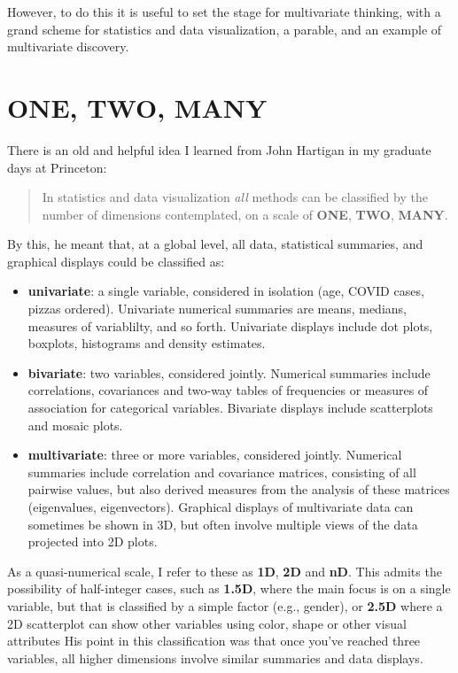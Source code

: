 \documentclass[
  letterpaper,
  10pt,
  krantz2]{krantz}
\providecommand{\tightlist}{%
  \setlength{\itemsep}{0pt}\setlength{\parskip}{0pt}}\usepackage{longtable,booktabs,array}
\begin{document}
However, to do this it is useful to set the stage for multivariate
thinking, with a grand scheme for statistics and data visualization, a
parable, and an example of multivariate discovery.

\hypertarget{one-two-many}{%
\section*{ONE, TWO, MANY}\label{one-two-many}}


There is an old and helpful idea I learned from John Hartigan in my
graduate days at Princeton:

\begin{quote}
In statistics and data visualization \emph{all} methods can be
classified by the number of dimensions contemplated, on a scale of
\textbf{ONE}, \textbf{TWO}, \textbf{MANY}.
\end{quote}

By this, he meant that, at a global level, all data, statistical
summaries, and graphical displays could be classified as:

\begin{itemize}
\tightlist
\item
  \textbf{univariate}: a single variable, considered in isolation (age,
  COVID cases, pizzas ordered). Univariate numerical summaries are
  means, medians, measures of variablilty, and so forth. Univariate
  displays include dot plots, boxplots, histograms and density
  estimates.
\item
  \textbf{bivariate}: two variables, considered jointly. Numerical
  summaries include correlations, covariances and two-way tables of
  frequencies or measures of association for categorical variables.
  Bivariate displays include scatterplots and mosaic plots.
\item
  \textbf{multivariate}: three or more variables, considered jointly.
  Numerical summaries include correlation and covariance matrices,
  consisting of all pairwise values, but also derived measures from the
  analysis of these matrices (eigenvalues, eigenvectors). Graphical
  displays of multivariate data can sometimes be shown in 3D, but often
  involve multiple views of the data projected into 2D plots.
\end{itemize}

As a quasi-numerical scale, I refer to these as \textbf{1D}, \textbf{2D}
and \textbf{nD}. This admits the possibility of half-integer cases, such
as \textbf{1.5D}, where the main focus is on a single variable, but that
is classified by a simple factor (e.g., gender), or \textbf{2.5D} where
a 2D scatterplot can show other variables using color, shape or other
visual attributes His point in this classification was that once you've
reached three variables, all higher dimensions involve similar summaries
and data displays.
\end{document}
